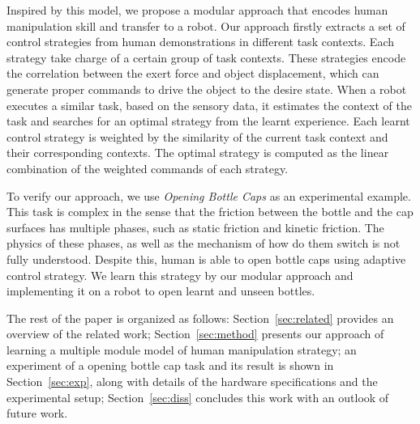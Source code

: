 Inspired by this model, we propose a modular approach that encodes human manipulation skill and transfer to a robot.
Our approach firstly extracts a set of control strategies from human demonstrations in different task contexts. Each strategy take charge of a certain group of task contexts. These strategies encode the correlation between the exert force and object displacement, which can generate proper commands to drive the object to the desire state.
When a robot executes a similar task, based on the sensory data, it estimates the context of the task and searches for an optimal strategy from the learnt experience. Each learnt control strategy is weighted by the similarity of the current task context and their corresponding contexts. The optimal strategy is computed as the linear combination of the weighted commands of each strategy.


To verify our approach, we use \emph{Opening Bottle Caps} as an experimental example. This task is complex in the sense that the friction between the bottle and the cap surfaces has multiple phases, such as static friction and kinetic friction. The physics of these phases, as well as the mechanism of how do them switch is not fully understood. Despite this, human is able to open bottle caps using adaptive control strategy. We learn this strategy by our modular approach and implementing it on a robot to open learnt and unseen bottles.


The rest of the paper is organized as follows: Section~\ref{sec:related} provides an overview of the related work; Section~\ref{sec:method} presents our approach of learning a multiple module model of human manipulation strategy; an experiment of a opening bottle cap task and its result is shown in Section~\ref{sec:exp}, along with details of the hardware specifications and the experimental setup; Section~\ref{sec:diss} concludes this work with an outlook of future work. 